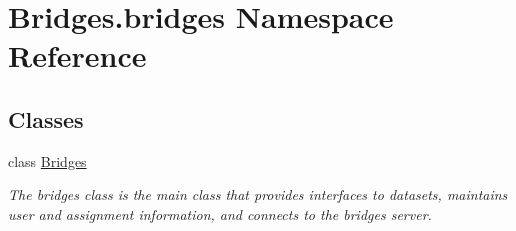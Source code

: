 \hypertarget{namespace_bridges_1_1bridges}{}\section{Bridges.\+bridges Namespace Reference}
\label{namespace_bridges_1_1bridges}
\subsection*{Classes}
\begin{DoxyCompactItemize}
\item 
class \mbox{\hyperlink{class_bridges_1_1bridges_1_1_bridges}{Bridges}}
\begin{DoxyCompactList}\small\item\em The bridges class is the main class that provides interfaces to datasets, maintains user and assignment information, and connects to the bridges server. \end{DoxyCompactList}\end{DoxyCompactItemize}
